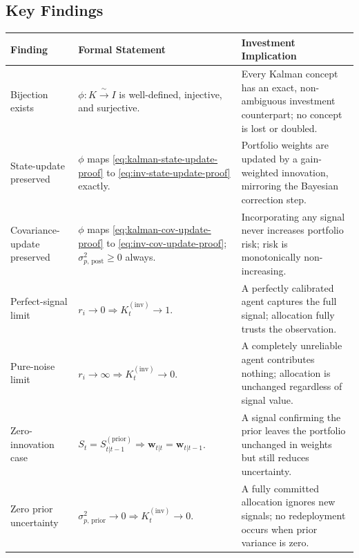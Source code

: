 \documentclass[12pt,openany]{book}
\numberwithin{equation}{chapter}
\theoremstyle{plain}
\theoremstyle{definition}
\theoremstyle{remark}
\def\mathcal#1{#1}%
\begin{document}
\subsection*{Key Findings}

\begin{center}
\begin{tabularx}{\textwidth}{@{} p{3.8cm} p{4.5cm} X @{}}
\toprule
\textbf{Finding} & \textbf{Formal Statement}
  & \textbf{Investment Implication} \\
\midrule
Bijection exists
  & $\phi : \mathcal{K} \xrightarrow{\;\sim\;} \mathcal{I}$
    is well-defined, injective, and surjective.
  & Every Kalman concept has an exact, non-ambiguous
    investment counterpart; no concept is lost or doubled. \\[4pt]
State-update preserved
  & $\phi$ maps \eqref{eq:kalman-state-update-proof}
    to \eqref{eq:inv-state-update-proof} exactly.
  & Portfolio weights are updated by a gain-weighted
    innovation, mirroring the Bayesian correction step. \\[4pt]
Covariance-update preserved
  & $\phi$ maps \eqref{eq:kalman-cov-update-proof}
    to \eqref{eq:inv-cov-update-proof}; $\sigma_{p,\,
    \text{post}}^2 \geq 0$ always.
  & Incorporating any signal never increases portfolio
    risk; risk is monotonically non-increasing. \\[4pt]
Perfect-signal limit
  & $r_i \to 0 \Rightarrow K_t^{(\mathrm{inv})} \to 1$.
  & A perfectly calibrated agent captures the full
    signal; allocation fully trusts the observation. \\[4pt]
Pure-noise limit
  & $r_i \to \infty \Rightarrow K_t^{(\mathrm{inv})} \to 0$.
  & A completely unreliable agent contributes nothing;
    allocation is unchanged regardless of signal value. \\[4pt]
Zero-innovation case
  & $S_t = S_{t|t-1}^{(\mathrm{prior})} \Rightarrow
    \mathbf{w}_{t|t} = \mathbf{w}_{t|t-1}$.
  & A signal confirming the prior leaves the portfolio
    unchanged in weights but still reduces uncertainty. \\[4pt]
Zero prior uncertainty
  & $\sigma_{p,\,\text{prior}}^2 \to 0
    \Rightarrow K_t^{(\mathrm{inv})} \to 0$.
  & A fully committed allocation ignores new signals;
    no redeployment occurs when prior variance is zero. \\
\bottomrule
\end{tabularx}
\end{center}
\end{document}

